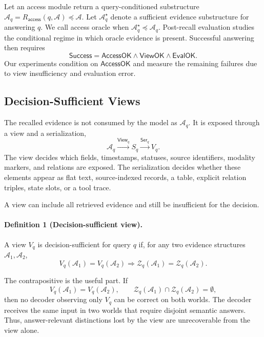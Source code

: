 Let an access module return a query-conditioned substructure $\mathcal A_q=R_{\mathsf{access}}(q,\mathcal A)\preceq\mathcal A$.
Let $\mathcal A_q^\star$ denote a sufficient evidence substructure for answering $q$.
We call access oracle when $\mathcal A_q^\star\preceq \mathcal A_q$.
Post-recall evaluation studies the conditional regime in which oracle evidence is present.
Successful answering then requires
\begin{equation}
\mathsf{Success}
=
\mathsf{AccessOK}
\land
\mathsf{ViewOK}
\land
\mathsf{EvalOK}.
\label{eq:success-factor}
\end{equation}
Our experiments condition on $\mathsf{AccessOK}$ and measure the remaining failures due to view insufficiency and evaluation error.

\subsection{Decision-Sufficient Views}
\label{subsec:decision-sufficient-views}

The recalled evidence is not consumed by the model as $\mathcal A_q$.
It is exposed through a view and a serialization,
\begin{equation}
\mathcal A_q
\xrightarrow{\mathsf{View}_q}
S_q
\xrightarrow{\mathsf{Ser}_q}
V_q .
\label{eq:view-pipeline}
\end{equation}
The view decides which fields, timestamps, statuses, source identifiers, modality markers, and relations are exposed.
The serialization decides whether these elements appear as flat text, source-indexed records, a table, explicit relation triples, state slots, or a tool trace.

A view can include all retrieved evidence and still be insufficient for the decision.

\paragraph{Definition 1 (Decision-sufficient view).}
A view $V_q$ is decision-sufficient for query $q$ if, for any two evidence structures $\mathcal A_1,\mathcal A_2$,
\begin{equation}
V_q(\mathcal A_1)=V_q(\mathcal A_2)
\Longrightarrow
\mathcal Z_q(\mathcal A_1)=\mathcal Z_q(\mathcal A_2).
\label{eq:view-sufficient}
\end{equation}

The contrapositive is the useful part.
If
\begin{equation}
V_q(\mathcal A_1)=V_q(\mathcal A_2),
\qquad
\mathcal Z_q(\mathcal A_1)\cap\mathcal Z_q(\mathcal A_2)=\emptyset,
\label{eq:view-collapse}
\end{equation}
then no decoder observing only $V_q$ can be correct on both worlds.
The decoder receives the same input in two worlds that require disjoint semantic answers.
Thus, answer-relevant distinctions lost by the view are unrecoverable from the view alone.

